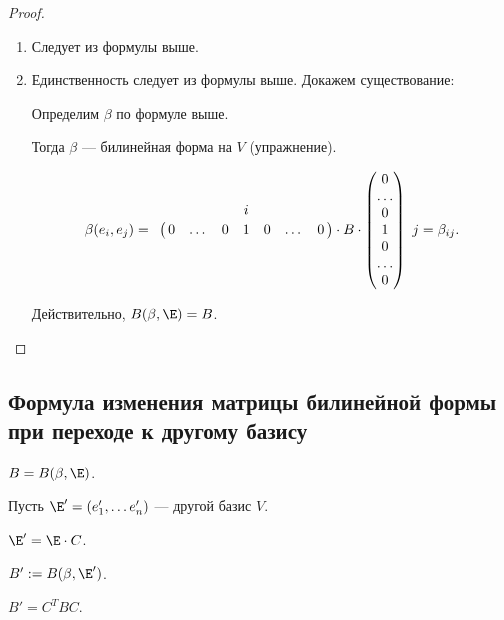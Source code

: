 \begin{proof}~
    \begin{enumerate}
    \item Следует из формулы выше.
    \item Единственность следует из формулы выше. Докажем существование:

        Определим $\beta$ по формуле выше.

        Тогда $\beta$ --- билинейная форма на $V$ (упражнение).

        \begin{equation*}
            \beta(e_i, e_j) = \bordermatrix{
                  &   &   &   & i &   &   &  \cr
                  & 0 & \dots & 0 & 1 & 0 & \dots & 0
            } \cdot B \cdot \begin{pmatrix} 
                0 \\ \dots \\ 0 \\ 1 \\ 0 \\ \dots \\ 0
            \end{pmatrix} \ j = \beta_{ij}
        .\end{equation*}

        Действительно, $B(\beta, \E) = B$.
        \qedhere
    \end{enumerate}
\end{proof}


\subsection{Формула изменения матрицы билинейной формы при переходе к другому базису}

$B = B(\beta, \E)$.

Пусть $\E' = (e'_1, \dots e'_n)$ --- другой базис $V$.

$\E' = \E \cdot C$.

$B' := B(\beta, \E')$.

\begin{proposal}
    $B' = C^{T} B C$.
\end{proposal}

